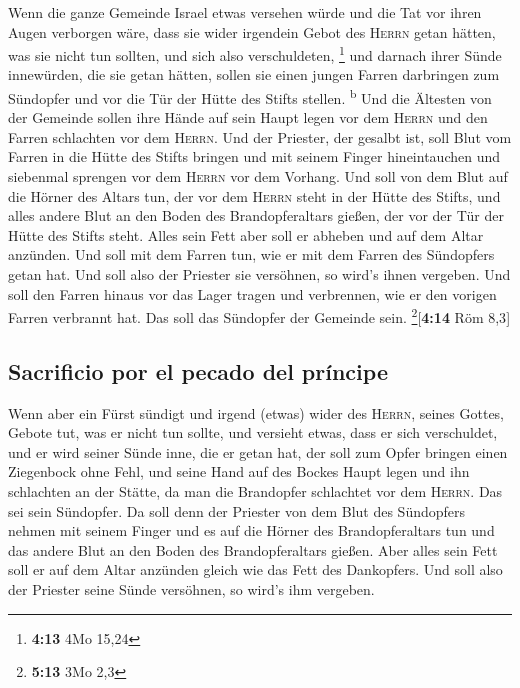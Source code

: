  Wenn die ganze Gemeinde Israel etwas versehen würde und
die Tat vor ihren Augen verborgen wäre, dass sie wider irgendein Gebot
des \textsc{Herrn} getan hätten, was sie nicht tun sollten, und sich
also verschuldeten, \footnote{\textbf{4:13} 4Mo 15,24} 
und darnach ihrer Sünde innewürden, die sie getan hätten, sollen sie
einen jungen Farren darbringen zum Sündopfer und vor die Tür der Hütte
des Stifts stellen. \textsuperscript{b}  Und die Ältesten
von der Gemeinde sollen ihre Hände auf sein Haupt legen vor dem
\textsc{Herrn} und den Farren schlachten vor dem \textsc{Herrn}.
 Und der Priester, der gesalbt ist, soll Blut vom Farren
in die Hütte des Stifts bringen  und mit seinem Finger
hineintauchen und siebenmal sprengen vor dem \textsc{Herrn} vor dem
Vorhang.  Und soll von dem Blut auf die Hörner des Altars
tun, der vor dem \textsc{Herrn} steht in der Hütte des Stifts, und alles
andere Blut an den Boden des Brandopferaltars gießen, der vor der Tür
der Hütte des Stifts steht.  Alles sein Fett aber soll er
abheben und auf dem Altar anzünden.  Und soll mit dem
Farren tun, wie er mit dem Farren des Sündopfers getan hat. Und soll
also der Priester sie versöhnen, so wird's ihnen vergeben.
 Und soll den Farren hinaus vor das Lager tragen und
verbrennen, wie er den vorigen Farren verbrannt hat. Das soll das
Sündopfer der Gemeinde sein. \footnote{\textbf{5:13} 3Mo 2,3}{[}\textbf{4:14}
Röm 8,3{]}

\hypertarget{sacrificio-por-el-pecado-del-pruxedncipe}{%
\subsection{Sacrificio por el pecado del
príncipe}\label{sacrificio-por-el-pecado-del-pruxedncipe}}

 Wenn aber ein Fürst sündigt und irgend (etwas) wider des
\textsc{Herrn}, seines Gottes, Gebote tut, was er nicht tun sollte, und
versieht etwas, dass er sich verschuldet,  und er wird
seiner Sünde inne, die er getan hat, der soll zum Opfer bringen einen
Ziegenbock ohne Fehl,  und seine Hand auf des Bockes
Haupt legen und ihn schlachten an der Stätte, da man die Brandopfer
schlachtet vor dem \textsc{Herrn}. Das sei sein Sündopfer.
 Da soll denn der Priester von dem Blut des Sündopfers
nehmen mit seinem Finger und es auf die Hörner des Brandopferaltars tun
und das andere Blut an den Boden des Brandopferaltars gießen.
 Aber alles sein Fett soll er auf dem Altar anzünden
gleich wie das Fett des Dankopfers. Und soll also der Priester seine
Sünde versöhnen, so wird's ihm vergeben.

